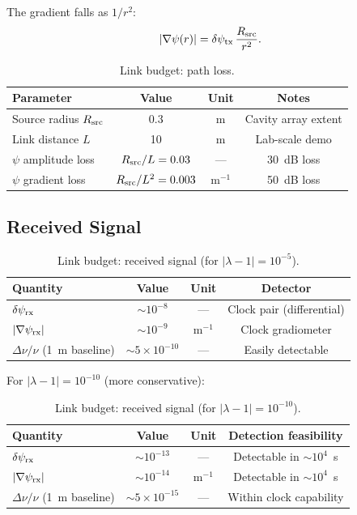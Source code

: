 \documentclass[11pt,onecolumn]{article}
\begin{document}
The gradient falls as $1/r^2$:
\begin{equation}
|\nabla\psi(r)| = \delta\psi_{\rm tx}\,\frac{R_{\rm src}}{r^2}.
\end{equation}

\begin{table}[H]
\centering
\caption{Link budget: path loss.}
\label{tab:path-loss}
\begin{tabular}{lccc}
\toprule
Parameter & Value & Unit & Notes \\
\midrule
Source radius $R_{\rm src}$ & 0.3 & m & Cavity array extent \\
Link distance $L$ & 10 & m & Lab-scale demo \\
$\psi$ amplitude loss & $R_{\rm src}/L = 0.03$ & --- & 30~dB loss \\
$\psi$ gradient loss & $R_{\rm src}/L^2 = 0.003$ & m$^{-1}$ & 50~dB loss \\
\bottomrule
\end{tabular}
\end{table}

\subsection{Received Signal}

\begin{table}[H]
\centering
\caption{Link budget: received signal (for $|\lambda-1| = 10^{-5}$).}
\label{tab:rx-signal}
\begin{tabular}{lccc}
\toprule
Quantity & Value & Unit & Detector \\
\midrule
$\delta\psi_{\rm rx}$ & $\sim 10^{-8}$ & --- & Clock pair (differential) \\
$|\nabla\psi_{\rm rx}|$ & $\sim 10^{-9}$ & m$^{-1}$ & Clock gradiometer \\
$\Delta\nu/\nu$ (1~m baseline) & $\sim 5 \times 10^{-10}$ & --- & Easily detectable \\
\bottomrule
\end{tabular}
\end{table}

For $|\lambda - 1| = 10^{-10}$ (more conservative):
\begin{table}[H]
\centering
\caption{Link budget: received signal (for $|\lambda-1| = 10^{-10}$).}
\label{tab:rx-signal-conservative}
\begin{tabular}{lccc}
\toprule
Quantity & Value & Unit & Detection feasibility \\
\midrule
$\delta\psi_{\rm rx}$ & $\sim 10^{-13}$ & --- & Detectable in $\sim 10^4$~s \\
$|\nabla\psi_{\rm rx}|$ & $\sim 10^{-14}$ & m$^{-1}$ & Detectable in $\sim 10^4$~s \\
$\Delta\nu/\nu$ (1~m baseline) & $\sim 5 \times 10^{-15}$ & --- & Within clock capability \\
\bottomrule
\end{tabular}
\end{table}
\end{document}

